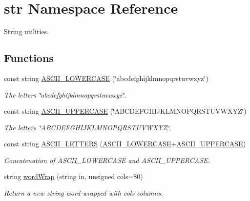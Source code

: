 \hypertarget{namespacestr}{\section{str Namespace Reference}
\label{namespacestr}
}


String utilities.  


\subsection*{Functions}
\begin{DoxyCompactItemize}
\item 
const string \hyperlink{namespacestr_a19bae57b57856a0060a878cf0530dced}{A\-S\-C\-I\-I\-\_\-\-L\-O\-W\-E\-R\-C\-A\-S\-E} (\char`\"{}abcdefghijklmnopqrstuvwxyz\char`\"{})
\begin{DoxyCompactList}\small\item\em The letters {\ttfamily \char`\"{}abcdefghijklmnopqrstuvwxyz\char`\"{}}. \end{DoxyCompactList}\item 
const string \hyperlink{namespacestr_a31cfca7b7762c003491b8ef8e76c36bc}{A\-S\-C\-I\-I\-\_\-\-U\-P\-P\-E\-R\-C\-A\-S\-E} (\char`\"{}A\-B\-C\-D\-E\-F\-G\-H\-I\-J\-K\-L\-M\-N\-O\-P\-Q\-R\-S\-T\-U\-V\-W\-X\-Y\-Z\char`\"{})
\begin{DoxyCompactList}\small\item\em The letters {\ttfamily \char`\"{}\-A\-B\-C\-D\-E\-F\-G\-H\-I\-J\-K\-L\-M\-N\-O\-P\-Q\-R\-S\-T\-U\-V\-W\-X\-Y\-Z\char`\"{}}. \end{DoxyCompactList}\item 
const string \hyperlink{namespacestr_a70d0301dce2a93813e08c3cc4600e721}{A\-S\-C\-I\-I\-\_\-\-L\-E\-T\-T\-E\-R\-S} (\hyperlink{namespacestr_a19bae57b57856a0060a878cf0530dced}{A\-S\-C\-I\-I\-\_\-\-L\-O\-W\-E\-R\-C\-A\-S\-E}+\hyperlink{namespacestr_a31cfca7b7762c003491b8ef8e76c36bc}{A\-S\-C\-I\-I\-\_\-\-U\-P\-P\-E\-R\-C\-A\-S\-E})
\begin{DoxyCompactList}\small\item\em Concatenation of {\ttfamily A\-S\-C\-I\-I\-\_\-\-L\-O\-W\-E\-R\-C\-A\-S\-E} and {\ttfamily A\-S\-C\-I\-I\-\_\-\-U\-P\-P\-E\-R\-C\-A\-S\-E}. \end{DoxyCompactList}\item 
string \hyperlink{namespacestr_a7b677ee9cce42c91dcd37d68b7fa04ac}{word\-Wrap} (string in, unsigned cols=80)
\begin{DoxyCompactList}\small\item\em Return a new string word-\/wrapped with {\ttfamily cols} columns. \end{DoxyCompactList}\end{DoxyCompactItemize}
